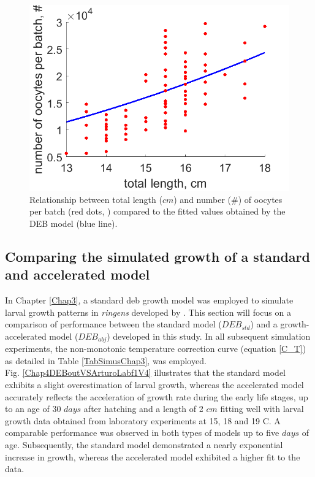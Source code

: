 \begin{figure}[H]
	\includegraphics[width=1.0\textwidth]{figures/Chap4LengthVSOocytes.png}
	\centering
	\caption{Relationship between total length ($cm$) and number ($\#$) of oocytes per batch (red dots, \cite{PereBuit2000}) compared to the fitted values obtained by the DEB model (blue line).}
	\label{Chap4LengthVSOocytes}
\end{figure}

\subsection{Comparing the simulated growth of a standard and accelerated model}

In Chapter \ref{Chap3}, a standard \acrshort{deb} growth model was employed to simulate larval growth patterns in \textit{\gls{ringens}} developed by \cite{PethRoos2013}. This section will focus on a comparison of performance between the standard model ($DEB_{std}$) and a growth-accelerated model ($DEB_{abj}$) developed in this study. In all subsequent simulation experiments, the non-monotonic temperature correction curve (equation \ref{C_T}) as detailed in Table \ref{TabSimusChap3}, was employed.\\

Fig. \ref{Chap4DEBoutVSArturoLabf1V4} illustrates that the standard model exhibits a slight overestimation of larval growth, whereas the accelerated model accurately reflects the acceleration of growth rate during the early life stages, up to an age of 30 $days$ after hatching and a length of 2 $cm$ fitting well with larval growth data obtained from laboratory experiments at 15, 18 and 19 \textdegree C. A comparable performance was observed in both types of models up to five $days$ of age. Subsequently, the standard model demonstrated a nearly exponential increase in growth, whereas the accelerated model exhibited a higher fit to the data.\\

